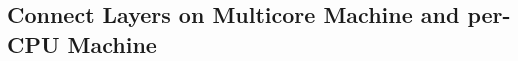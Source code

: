 
\subsection{Connect Layers on Multicore Machine and per-CPU Machine}
\label{chapter:certikos:subsec:connect-multicore}


